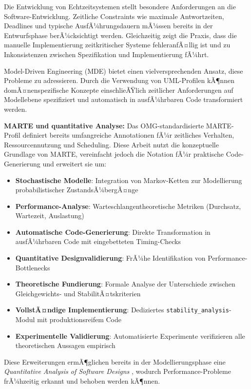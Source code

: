 ﻿\documentclass[a4paper,12pt]{report}
\theoremstyle{definition}
\begin{document}
Die Entwicklung von Echtzeitsystemen stellt besondere Anforderungen an die Software-Entwicklung. Zeitliche Constraints wie maximale Antwortzeiten, Deadlines und typische AusfÃ¼hrungsdauern mÃ¼ssen bereits in der Entwurfsphase berÃ¼cksichtigt werden. Gleichzeitig zeigt die Praxis, dass die manuelle Implementierung zeitkritischer Systeme fehleranfÃ¤llig ist und zu Inkonsistenzen zwischen Spezifikation und Implementierung fÃ¼hrt.

Model-Driven Engineering (MDE) bietet einen vielversprechenden Ansatz, diese Probleme zu adressieren. Durch die Verwendung von UML-Profilen kÃ¶nnen domÃ¤nenspezifische Konzepte einschlieÃŸlich zeitlicher Anforderungen auf Modellebene spezifiziert und automatisch in ausfÃ¼hrbaren Code transformiert werden.

\textbf{MARTE und quantitative Analyse:} Das OMG-standardisierte MARTE-Profil \cite{marte} definiert bereits umfangreiche Annotationen fÃ¼r zeitliches Verhalten, Ressourcennutzung und Scheduling. Diese Arbeit nutzt die konzeptuelle Grundlage von MARTE, vereinfacht jedoch die Notation fÃ¼r praktische Code-Generierung und erweitert sie um:

\begin{itemize}
	\item[-] \textbf{Stochastische Modelle}: Integration von Markov-Ketten
	zur Modellierung probabilistischer ZustandsÃ¼bergÃ¤nge
	\item[-] \textbf{Performance-Analyse}: Warteschlangentheoretische Metriken
	(Durchsatz, Wartezeit, Auslastung)
	\item[-] \textbf{Automatische Code-Generierung}: Direkte Transformation in
	ausfÃ¼hrbaren Code mit eingebetteten Timing-Checks
	\item[-] \textbf{Quantitative Designvalidierung}: FrÃ¼he Identifikation von
	Performance-Bottle\-necks
	\item[-] \textbf{Theoretische Fundierung}: Formale Analyse der Unterschiede
	zwischen Gleichge\-wichts- und StabilitÃ¤tskriterien
	\item[-] \textbf{VollstÃ¤ndige Implementierung}: Dediziertes
	\texttt{stability\_analysis}-Modul mit produktionsreifem Code
	\item[-] \textbf{Experimentelle Validierung}: Automatisierte Experimente
	verifizieren alle theoretischen Aussagen empirisch
\end{itemize}

Diese Erweiterungen ermÃ¶glichen bereits in der Modellierungsphase eine \textit{Quantitative Analysis of Software Designs} \cite{smith1990}, wodurch Performance-Probleme frÃ¼hzeitig erkannt und behoben werden kÃ¶nnen.
\end{document}
